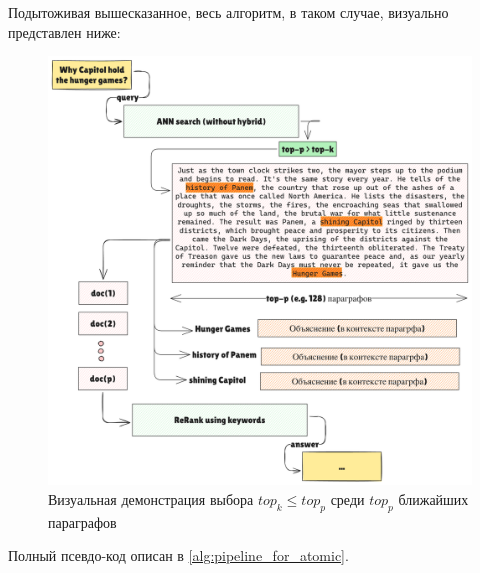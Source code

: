Подытоживая вышесказанное, весь алгоритм, в таком случае, визуально представлен ниже:

\begin{figure}[ht]
    \centering
    \includegraphics[width=\columnwidth]{figures/top-k-top-p.png} %
    \caption{Визуальная демонстрация выбора $top_k \leq top_p$ среди $top_p$ ближайших параграфов}
    \label{fig:comparison-phir-content-vs-keywords}
\end{figure}

Полный псевдо-код описан в \ref{alg:pipeline_for_atomic}.

